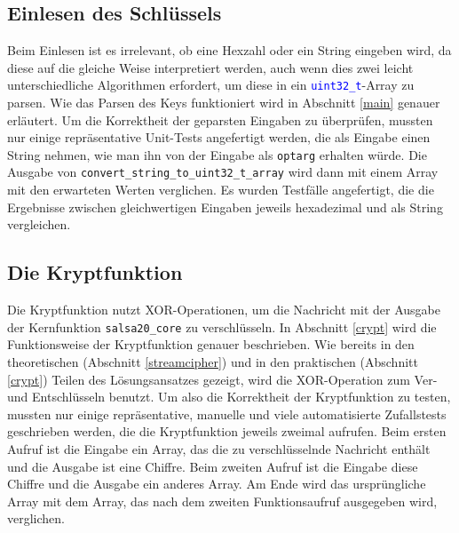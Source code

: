 \documentclass[course=erap]{aspdoc}
\begin{document}
\subsection{Einlesen des Schlüssels}
Beim Einlesen ist es irrelevant, ob eine Hexzahl oder ein String eingeben wird, da diese auf die gleiche Weise interpretiert werden, 
auch wenn dies zwei leicht unterschiedliche Algorithmen erfordert, um diese in ein \texttt{\textcolor{blue}{uint32\_t}}-Array zu parsen. 
Wie das Parsen des Keys funktioniert wird in Abschnitt \ref{main} genauer erläutert.
Um die Korrektheit der geparsten Eingaben zu überprüfen, mussten nur einige repräsentative Unit-Tests angefertigt werden, 
die als Eingabe einen String nehmen, wie man ihn von der Eingabe als \texttt{optarg} erhalten würde. Die Ausgabe 
von \texttt{convert\_string\_to\_uint32\_t\_array} wird dann mit einem Array mit den erwarteten Werten verglichen.
Es wurden Testfälle angefertigt, die die Ergebnisse zwischen gleichwertigen Eingaben jeweils hexadezimal und als String vergleichen.


\subsection{Die Kryptfunktion}
Die Kryptfunktion nutzt XOR-Operationen, um die Nachricht mit der Ausgabe der Kernfunktion \texttt{salsa20\_core} zu verschlüsseln.
In Abschnitt \ref{crypt} wird die Funktionsweise der Kryptfunktion genauer beschrieben.
Wie bereits in den theoretischen (Abschnitt \ref{streamcipher}) und in den praktischen (Abschnitt \ref{crypt}) Teilen des Lösungsansatzes gezeigt,
wird die XOR-Operation zum Ver- und Entschlüsseln benutzt. 
Um also die Korrektheit der Kryptfunktion zu testen, mussten nur einige repräsentative, manuelle
und viele automatisierte Zufallstests geschrieben werden, die die Kryptfunktion jeweils zweimal aufrufen.
Beim ersten Aufruf ist die Eingabe ein Array, das die zu verschlüsselnde Nachricht enthält und die Ausgabe ist eine Chiffre. 
Beim zweiten Aufruf ist die Eingabe diese Chiffre und die Ausgabe ein anderes Array. 
Am Ende wird das ursprüngliche Array mit dem Array, das nach dem zweiten 
Funktionsaufruf ausgegeben wird, verglichen.
\end{document}
